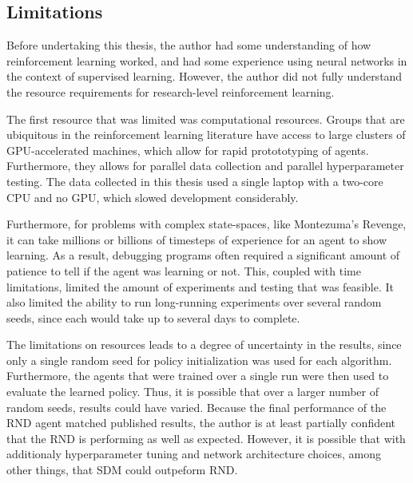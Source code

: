 \documentclass[journal, onecolumn, 12pt, draftclsnofoot]{IEEEtran}
\begin{document}
	\subsection{Limitations}
	\par Before undertaking this thesis, the author had some understanding of how reinforcement learning worked, and had some experience using neural networks in the context of supervised learning. However, the author did not fully understand the resource requirements for research-level reinforcement learning.
	\par The first resource that was limited was computational resources. Groups that are ubiquitous in the reinforcement learning literature have access to large clusters of GPU-accelerated machines, which allow for rapid protototyping of agents. Furthermore, they allows for parallel data collection and parallel hyperparameter testing. The data collected in this thesis used a single laptop with a two-core CPU and no GPU, which slowed development considerably.
	\par Furthermore, for problems with complex state-spaces, like Montezuma's Revenge, it can take millions or billions of timesteps of experience for an agent to show learning. As a result, debugging programs often required a significant amount of patience to tell if the agent was learning or not. This, coupled with time limitations, limited the amount of experiments and testing that was feasible. It also limited the ability to run long-running experiments over several random seeds, since each would take up to several days to complete.
	\par The limitations on resources leads to a degree of uncertainty in the results, since only a single random seed for policy initialization was used for each algorithm. Furthermore, the agents that were trained over a single run were then used to evaluate the learned policy. Thus, it is possible that over a larger number of random seeds, results could have varied. Because the final performance of the RND agent matched published results, the author is at least partially confident that the RND is performing as well as expected. However, it is possible that with additionaly hyperparameter tuning and network architecture choices, among other things, that SDM could outpeform RND.
\end{document}
